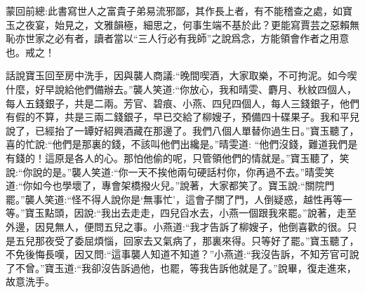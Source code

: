 

\begin{parag}
    \begin{note}蒙回前總:此書寫世人之富貴子弟易流邪鄙，其作長上者，有不能稽查之處，如寶玉之夜宴，始見之，文雅韻極，細思之，何事生端不基於此？更能寫賈芸之惡賴無恥亦世家之必有者，讀者當以“三人行必有我師”之說爲念，方能領會作者之用意也。戒之！\end{note}
\end{parag}


\begin{parag}
    話說寶玉回至房中洗手，因與襲人商議:“晚間喫酒，大家取樂，不可拘泥。如今喫什麼，好早說給他們備辦去。”襲人笑道:“你放心，我和晴雯、麝月、秋紋四個人，每人五錢銀子，共是二兩。芳官、碧痕、小燕、四兒四個人，每人三錢銀子，他們有假的不算，共是三兩二錢銀子，早已交給了柳嫂子，預備四十碟果子。我和平兒說了，已經抬了一罈好紹興酒藏在那邊了。我們八個人單替你過生日。”寶玉聽了，喜的忙說:“他們是那裏的錢，不該叫他們出纔是。”晴雯道: “他們沒錢，難道我們是有錢的！這原是各人的心。那怕他偷的呢，只管領他們的情就是。”寶玉聽了，笑說:“你說的是。”襲人笑道:“你一天不挨他兩句硬話村你，你再過不去。”晴雯笑道:“你如今也學壞了，專會架橋撥火兒。”說著，大家都笑了。寶玉說:“關院門罷。”襲人笑道:“怪不得人說你是‘無事忙’，這會子關了門，人倒疑惑，越性再等一等。”寶玉點頭，因說:“我出去走走，四兒舀水去，小燕一個跟我來罷。”說著，走至外邊，因見無人，便問五兒之事。小燕道:“我才告訴了柳嫂子，他倒喜歡的很。只是五兒那夜受了委屈煩惱，回家去又氣病了，那裏來得。只等好了罷。”寶玉聽了，不免後悔長嘆，因又問:“這事襲人知道不知道？”小燕道:“我沒告訴，不知芳官可說了不曾。”寶玉道:“我卻沒告訴過他，也罷，等我告訴他就是了。”說畢，復走進來，故意洗手。
\end{parag}


